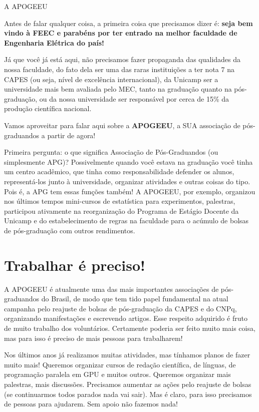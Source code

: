 
\begin{story}{A APOGEEU}

Antes de falar qualquer coisa, a primeira coisa que precisamos dizer é: \textbf{seja bem vindo à FEEC e parabéns por ter entrado na melhor faculdade de Engenharia Elétrica do país!}

Já que você já está aqui, não precisamos fazer propaganda das qualidades da nossa faculdade, do fato dela ser uma das raras instituições a ter nota 7 na CAPES (ou seja, nível de excelência internacional), da Unicamp ser a universidade mais bem avaliada pelo MEC, tanto na graduação quanto na pós-graduação, ou da nossa universidade ser responsável por cerca de 15\% da produção científica nacional.

Vamos aproveitar para falar aqui sobre a \textbf{APOGEEU}, a SUA associação de pós-graduandos a partir de agora!

Primeira pergunta: o que significa Associação de Pós-Graduandos (ou simplesmente APG)? Possivelmente quando você estava na graduação você tinha um centro acadêmico, que tinha como responsabilidade defender os alunos, representá-los junto à universidade, organizar atividades e outras coisas do tipo. Pois é, a APG tem essas funções também! A APOGEEU, por exemplo, organizou nos últimos tempos mini-cursos de estatística para experimentos, palestras, participou ativamente na reorganização do Programa de Estágio Docente da Unicamp e do estabelecimento de regras na faculdade para o acúmulo de bolsas de pós-graduação com outros rendimentos.

\section*{Trabalhar é preciso!}

A APOGEEU é atualmente uma das mais importantes associações de pós-graduandos do Brasil, de modo que tem tido papel fundamental na atual campanha pelo reajuste de bolsas de pós-graduação da CAPES e do CNPq, organizando manifestações e escrevendo artigos. Esse respeito adquirido é fruto de muito trabalho dos voluntários. Certamente poderia ser feito muito mais coisa, mas para isso é preciso de mais pessoas para trabalharem!

Nos últimos anos já realizamos muitas atividades, mas tínhamos planos de fazer muito mais! Queremos organizar cursos de redação científica, de línguas, de programação paralela em GPU e muitos outros. Queremos organizar mais palestras, mais discussões. Precisamos aumentar as ações pelo reajuste de bolsas (se continuarmos todos parados nada vai sair). Mas é claro, para isso precisamos de pessoas para ajudarem. Sem apoio não fazemos nada!


\end{story}
